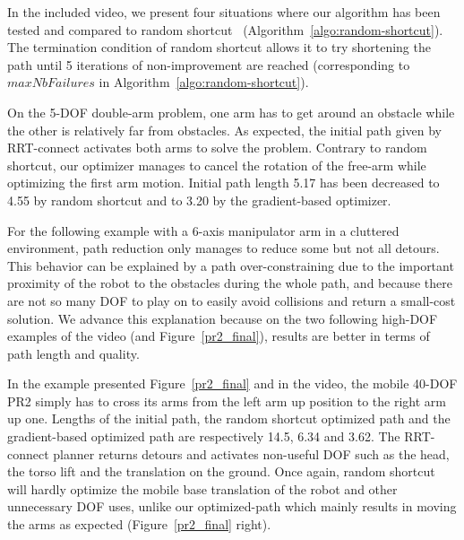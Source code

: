 \documentclass{tADR2e}
\begin{document}
In the included video, we present four situations where our algorithm has been 
tested and compared to random shortcut~\cite{randomShortcutHPP}
(Algorithm~\ref{algo:random-shortcut}).
The termination condition of random shortcut allows it to try 
shortening the path until 5 iterations of non-improvement are reached 
(corresponding to $maxNbFailures$ in Algorithm~\ref{algo:random-shortcut}).

On the 5-DOF double-arm problem, one arm has to get around an obstacle while the 
other is relatively far from obstacles. As expected, the initial path given by 
RRT-connect activates both arms to solve the problem. Contrary to random shortcut, 
our optimizer manages to cancel the rotation of the free-arm while optimizing the 
first arm motion. Initial path length 5.17 has been decreased to 4.55 by random shortcut and to 3.20 by the gradient-based optimizer.


For the following example with a 6-axis manipulator arm 
in a  cluttered environment, path reduction only manages to reduce some but not 
all detours. This behavior can be explained by a path over-constraining due to the 
important proximity of the robot to the obstacles during the whole path, and 
because there are not so many DOF to play on to easily avoid collisions and 
return a small-cost solution.
We advance this explanation because on the two following high-DOF examples of the video (and Figure~\ref{pr2_final}), results are better 
in terms of path length and quality.

In the example presented Figure~\ref{pr2_final} and in the video, the mobile 
40-DOF PR2 simply has to cross its arms from 
the left arm up position to the right arm up one. Lengths of the initial path, the 
random shortcut optimized path and the gradient-based optimized path are 
respectively 14.5, 6.34 and 3.62. The RRT-connect planner 
returns detours and activates non-useful DOF such as the head, the torso lift 
and the translation on 
the ground. Once again, random shortcut will hardly optimize the mobile base 
translation of the robot and other unnecessary DOF uses, unlike our 
optimized-path which mainly results in moving the arms as expected 
(Figure~\ref{pr2_final} right).
\end{document}
